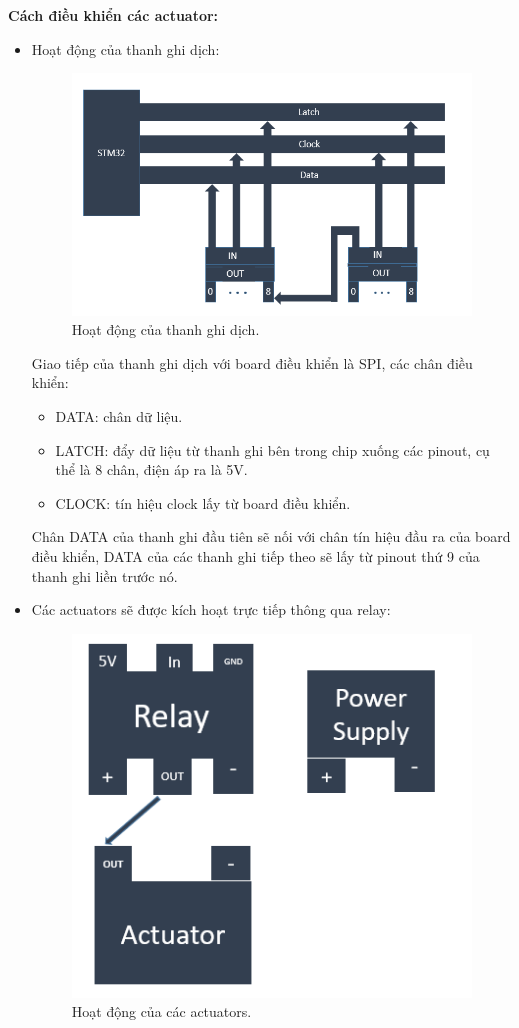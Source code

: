 \documentclass[a4paper,12pt,oneside]{article}
\begin{document}
\textbf{Cách điều khiển các actuator:}
\begin{itemize}

\item Hoạt động của thanh ghi dịch:

\begin{figure}[H]
	\centering
	\includegraphics[scale=0.8]{hinh/stm_register.PNG}
	\caption{Hoạt động của thanh ghi dịch.}
\end{figure}

\noindent Giao tiếp của thanh ghi dịch với board điều khiển là SPI, các chân điều khiển:
\begin{itemize}
\item DATA: chân dữ liệu.
\item LATCH: đẩy dữ liệu từ thanh ghi bên trong chip xuống các pinout, cụ thể là 8 chân, điện áp ra là 5V.
\item CLOCK: tín hiệu clock lấy từ board điều khiển.
\end{itemize}

\noindent Chân DATA của thanh ghi đầu tiên sẽ nối với chân tín hiệu đầu ra của board điều khiển, DATA của các thanh ghi tiếp theo sẽ lấy từ pinout thứ 9 của thanh ghi liền trước nó.

\item Các actuators sẽ được kích hoạt trực tiếp thông qua relay:

\begin{figure}[H]
	\centering
	\includegraphics[scale=0.8]{hinh/actuator.PNG}
	\caption{Hoạt động của các actuators.}
\end{figure}


\end{itemize}
\end{document}
